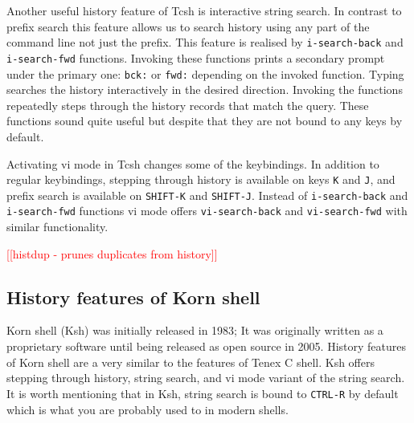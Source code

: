 \documentclass[thesis=M,english]{FITthesis}[2012/10/20]
\newcommand{\redtext}[1]{\textcolor{red}{[[#1]]}}
\begin{document}
Another useful history feature of Tcsh is interactive string search. In contrast to prefix search this feature allows us to search history using any part of the command line not just the prefix. This feature is realised by \verb|i-search-back| and \verb|i-search-fwd| functions. Invoking these functions prints a secondary prompt under the primary one: \verb|bck:| or \verb|fwd:| depending on the invoked function. Typing searches the history interactively in the desired direction. Invoking the functions repeatedly steps through the history records that match the query.
These functions sound quite useful but despite that they are not bound to any keys by default.

Activating vi mode in Tcsh changes some of the keybindings. In addition to regular keybindings, stepping through history is available on keys \verb|K| and \verb|J|, and prefix search is available on \verb|SHIFT-K| and \verb|SHIFT-J|. Instead of \verb|i-search-back| and \verb|i-search-fwd| functions vi mode offers \verb|vi-search-back| and \verb|vi-search-fwd| with similar functionality.

\redtext{histdup - prunes duplicates from history}



\subsection{History features of Korn shell}
Korn shell (Ksh) was initially released in 1983; It was originally written as a proprietary software until being released as open source in 2005.  History features of Korn shell are a very similar to the features of Tenex C shell. Ksh offers stepping through history, string search, and vi mode variant of the string search. It is worth mentioning that in Ksh, string search is bound to \verb|CTRL-R| by default which is what you are probably used to in modern shells. 
\end{document}
